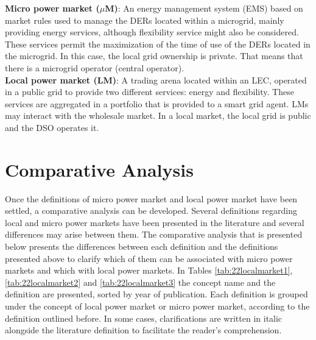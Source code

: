 
\begin{tcolorbox}
\textbf{Micro power market ($\mu$M)}: An energy management system (EMS) based on market rules used to
manage the DERs located within a microgrid, mainly providing energy services, although flexibility service
might also be considered. These services permit the maximization of the time of use of the DERs located in
the microgrid. In this case, the local grid ownership is private. That means that there is a microgrid operator
(central operator).\\
\newline
\textbf{Local power market (LM)}: A trading arena located within an LEC, operated in a public grid to provide
two different services: energy and flexibility. These services are aggregated in a portfolio that is provided to
a smart grid agent. LMs may interact with the wholesale market.
In a local market, the local grid is public and the DSO operates it.
\end{tcolorbox}

\section{Comparative Analysis} \label{sec:comparative}
Once the definitions of micro power market and local power market have been settled, a comparative analysis can be developed. Several definitions regarding local and micro power markets have been presented in the literature and several differences may arise between them. The comparative analysis that is presented below presents the differences between each definition and the definitions presented above to clarify which of them can be associated with micro power markets and which with local power markets. In Tables \ref{tab:22localmarket1}, \ref{tab:22localmarket2} and \ref{tab:22localmarket3} the concept name and the definition are presented, sorted by year of publication. Each definition is grouped under the concept of local power market or micro power market, according to the definition outlined before. In some cases, clarifications are written in italic alongside the literature definition to facilitate the reader's comprehension.


